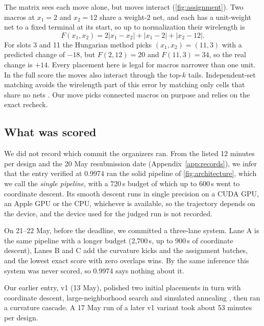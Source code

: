 The matrix sees each move alone, but moves interact (\cref{fig:assignment}). Two
macros at $x_1=2$ and $x_2=12$ share a weight-2 net, and each has a unit-weight net to
a fixed terminal at its start, so up to normalization their wirelength is
\begin{equation}
 F(x_1,x_2)=2|x_1-x_2|+|x_1-2|+|x_2-12|.
 \label{eq:assignment-example}
\end{equation}
For slots 3 and 11 the Hungarian method picks $(x_1,x_2)=(11,3)$ with a predicted
change of $-18$, but $F(2,12)=20$ and $F(11,3)=34$, so the real change is $+14$. Every
placement here is legal for macros narrower than one unit. In the full score the
moves also interact through the top-$k$ tails. Independent-set matching avoids the
wirelength part of this error by matching only cells that share no nets
\citep{chen2008ntuplace3}. Our move picks connected macros on purpose and relies on
the exact recheck.

\subsection{What was scored}\label{sec:scored}

We did not record which commit the organizers ran. From the listed 12 minutes per
design and the 20 May resubmission date (Appendix~\ref{app:records}), we infer that
the entry verified at 0.9974 ran the solid pipeline of \cref{fig:architecture}, which
we call the \emph{single pipeline}, with a 720\,s budget of which up to 600\,s went
to coordinate descent. Its smooth descent runs in single precision on a CUDA GPU, an
Apple GPU or the CPU, whichever is available, so the trajectory depends on the
device, and the device used for the judged run is not recorded.

On 21--22 May, before the deadline, we committed a three-lane system. Lane A is the
same pipeline with a longer budget (2,700\,s, up to 900\,s of coordinate descent),
Lanes B and C add the curvature kicks and the assignment batches, and the lowest exact
score with zero overlaps wins. By the same inference this system was never scored,
so 0.9974 says nothing about it.

Our earlier entry, v1 (13 May), polished two initial placements in turn with
coordinate descent, large-neighborhood search and simulated annealing
\citep{kirkpatrick1983sa}, then ran a curvature cascade. A 17 May run of a later v1
variant took about 53 minutes per design.
